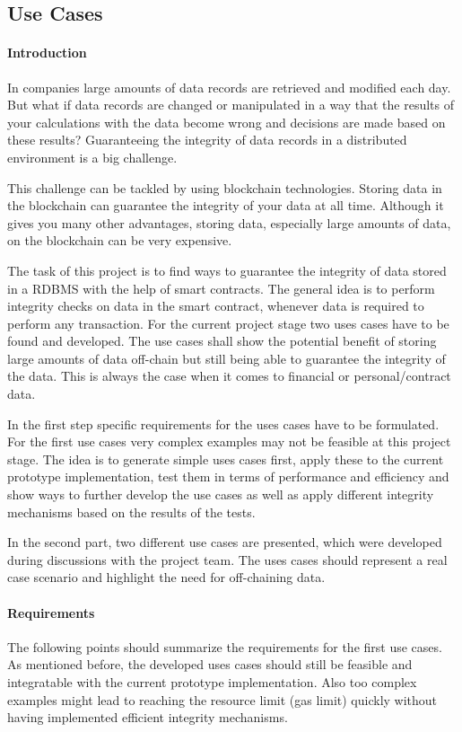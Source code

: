 \subsection{Use Cases}



\paragraph{Introduction}
In companies large amounts of data records are retrieved and modified each day. But what if data records are changed or manipulated in a way that the results of your calculations with the data become wrong and decisions are made based on these results? Guaranteeing the integrity of data records in a distributed environment is a big challenge.

This challenge can be tackled by using blockchain technologies. Storing data in the blockchain can guarantee the integrity of your data at all time. Although it gives you many other advantages, storing data, especially large amounts of data, on the blockchain can be very expensive.

The task of this project is to find ways to guarantee the integrity of data stored in a RDBMS with the help of smart contracts. The general idea is to perform integrity checks on data in the smart contract, whenever data is required to perform any transaction. For the current project stage two uses cases have to be found and developed. The use cases shall show the potential benefit of storing large amounts of data off-chain but still being able to guarantee the integrity of the data. This is always the case when it comes to financial or personal/contract data.

In the first step specific requirements for the uses cases have to be formulated. For the first use cases very complex examples may not be feasible at this project stage. The idea is to generate simple uses cases first, apply these to the current prototype implementation, test them in terms of performance and efficiency and show ways to further develop the use cases as well as apply different integrity mechanisms based on the results of the tests.

In the second part, two different use cases are presented, which were developed during discussions with the project team. The uses cases should represent a real case scenario and highlight the need for off-chaining data.

\paragraph{Requirements}
The following points should summarize the requirements for the first use cases. As mentioned before, the developed uses cases should still be feasible and integratable with the current prototype implementation. Also too complex examples might lead to reaching the resource limit (gas limit) quickly without having implemented efficient integrity mechanisms.

